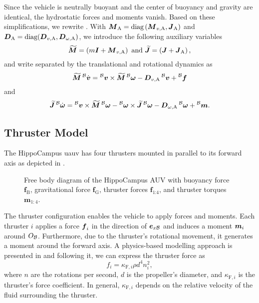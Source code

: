 Since the vehicle is neutrally buoyant and the center of buoyancy and gravity are identical, the hydrostatic forces and moments vanish. Based on these simplifications, we rewrite . With $\mbox{$\bm{M}$}_\text{A} = \text{diag}\left(\mbox{$\bm{M}$}_{v, \text{A}}, \mbox{$\bm{J}$}_\text{A}\right)$ and $\mbox{$\bm{D}$}_\text{A} = \text{diag}(\mbox{$\bm{D}$}_{v,\text{A}}, \mbox{$\bm{D}$}_{\omega,\text{A}})$, we introduce the following auxiliary variables
\begin{equation}
	\mbox{$\widetilde{\bm{M}}$} = \left(m\mbox{$\bm{I}$} + \mbox{$\bm{M}$}_{v, \text{A}}\right)\text{ and }
	\mbox{$\widetilde{\bm{J}}$} = \left(\mbox{$\bm{J}$} + \mbox{$\bm{J}$}_\text{A}\right)
    ,
\end{equation}
and write  separated by the translational and rotational dynamics as
\begin{equation}
	\label{eq:equation-of-motion-translational}
	\mbox{$\widetilde{\bm{M}}$} \prescript{\mathcal{B}}{}{\mbox{$\dot{\bm{v}}$}} =
	\prescript{\mathcal{B}}{}{\mbox{$\bm{v}$}} \times \mbox{$\widetilde{\bm{M}}$} \prescript{\mathcal{B}}{}{\mbox{$\bm{\omega}$}}
	-\mbox{$\bm{D}$}_{v,\text{A}} \prescript{\mathcal{B}}{}{\mbox{$\bm{v}$}}
	+ \prescript{\mathcal{B}}{}{\mbox{$\bm{f}$}}
\end{equation}%
and
\begin{equation}
	\label{eq:equation-of-motion-rotational}
	\mbox{$\widetilde{\bm{J}}$} \prescript{\mathcal{B}}{}{\mbox{$\dot{\bm{\omega}}$}} =
	\prescript{\mathcal{B}}{}{\mbox{$\bm{v}$}} \times \mbox{$\widetilde{\bm{M}}$} \prescript{\mathcal{B}}{}{\mbox{$\bm{\omega}$}}
	- \prescript{\mathcal{B}}{}{\mbox{$\bm{\omega}$}} \times \mbox{$\widetilde{\bm{J}}$} \prescript{\mathcal{B}}{}{\mbox{$\bm{\omega}$}}
	- \mbox{$\bm{D}$}_{\omega,\text{A}} \prescript{\mathcal{B}}{}{\mbox{$\bm{\omega}$}}
	+ \prescript{\mathcal{B}}{}{\mbox{$\bm{m}$}}
	.
\end{equation}

\subsection{Thruster Model}
\label{sec:thruster-model}
The HippoCampus \ac{uauv} has four thrusters mounted in parallel to its forward axis as depicted in .
\begin{figure}[bt]
	\centering
	
	\caption{Free body diagram of the HippoCampus \mu AUV with buoyancy force $\bm{f}_\textrm{B}$, gravitational force $\bm{f}_\textrm{G}$, thruster forces $\bm{f}_\textrm{1:4}$, and thruster torques $\bm{m}_{1:4}$.}
	\label{fig:free-body-diagram}
\end{figure}
The thruster configuration enables the vehicle to apply forces and moments.
Each thruster $i$ applies a force $\mbox{$\bm{f}$}_{i}$ in the direction of $\mbox{$\bm{e}$}_{x\mathcal{B}}$ and induces a moment $\mbox{$\bm{m}$}_{i}$ around $O_{\mathcal{B}}$.
Furthermore, due to the thruster's rotational movement, it generates a moment around the forward axis. A physics-based modelling approach is presented in \cite{Newman77} and following it, we can express the thruster force as
\begin{equation}
	\label{eq:thrust-function-newman}
	f_i = \kappa_{\text{F},i}\rho d^4 n_i^2
	,
\end{equation}
where $n$ are the rotations per second, $d$ is the propeller's diameter, and $\kappa_{\text{F},i}$ is the thruster's force coefficient. In general, $\kappa_{\text{F},i}$ depends on the relative velocity of the fluid surrounding the thruster.

